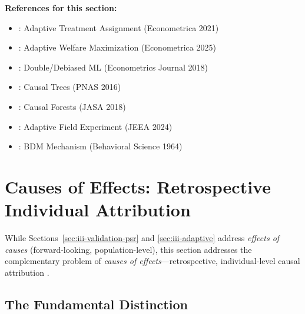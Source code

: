 \textbf{References for this section:}
\begin{itemize}[nosep]
\item \citet{kasy2021adaptive}: Adaptive Treatment Assignment (Econometrica 2021)
\item \citet{kasy2025adaptive}: Adaptive Welfare Maximization (Econometrica 2025)
\item \citet{chernozhukov2018double}: Double/Debiased ML (Econometrics Journal 2018)
\item \citet{athey2016recursive}: Causal Trees (PNAS 2016)
\item \citet{wager2018causalforest}: Causal Forests (JASA 2018)
\item \citet{caria2024refugees}: Adaptive Field Experiment (JEEA 2024)
\item \citet{becker1964bdm}: BDM Mechanism (Behavioral Science 1964)
\end{itemize}



\section{Causes of Effects: Retrospective Individual Attribution}
\label{sec:iii-coe}

While Sections~\ref{sec:iii-validation-psr} and \ref{sec:iii-adaptive} address
\emph{effects of causes} (forward-looking, population-level), this section addresses
the complementary problem of \emph{causes of effects}---retrospective, individual-level
causal attribution \citep{pearl2015causes, dawid2022effects}.

\subsection{The Fundamental Distinction}

